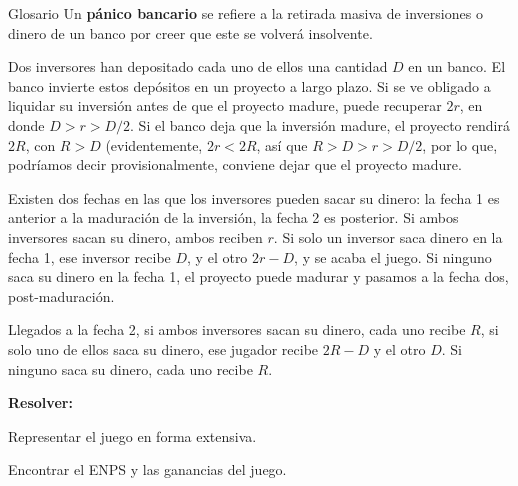 \documentclass[12pt]{scrartcl}
\begin{document}
\begin{mybox}[colback=red!20]{Glosario}
	Un \textbf{pánico bancario }se refiere a la retirada masiva de inversiones o dinero de un banco por creer que este se volverá insolvente. 
\end{mybox}

Dos inversores han depositado cada uno de ellos una cantidad $D$ en un banco. El banco invierte estos depósitos en un proyecto a largo plazo. Si se ve obligado a liquidar su inversión antes de que el proyecto madure, puede recuperar $2r$, en donde $D > r > D/2$. Si el banco deja que la inversión madure, el proyecto rendirá $2R$, con $R > D$ (evidentemente, $2r < 2R$, así que $R > D > r > D/2$, por lo que, podríamos decir provisionalmente, conviene dejar que el proyecto madure.

Existen dos fechas en las que los inversores pueden sacar su dinero: la fecha 1 es anterior a la maduración de la inversión, la fecha 2 es posterior. Si ambos inversores sacan su dinero, ambos reciben $r$. Si solo un inversor saca dinero en la fecha 1, ese inversor recibe $D$, y el otro $2r - D$, y se acaba el juego. Si ninguno saca su dinero en la fecha 1, el proyecto puede madurar y pasamos a la fecha dos, post-maduración. 

Llegados a la fecha 2, si ambos inversores sacan su dinero, cada uno recibe $R$, si solo uno de ellos saca su dinero, ese jugador recibe $2R - D$ y el otro $D$. Si ninguno saca su dinero, cada uno recibe $R$. 

\textbf{Resolver:}

\begin{myenum}
	\item Representar el juego en forma extensiva.
	\item Encontrar el ENPS y las ganancias del juego.
\end{myenum}
\end{document}
